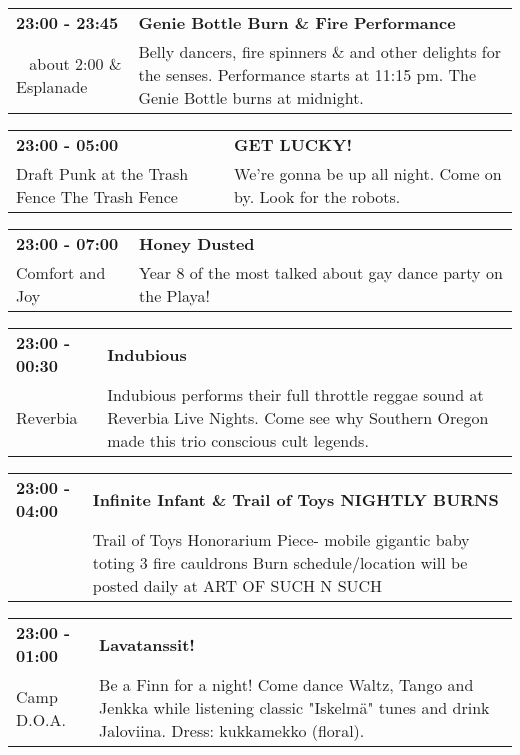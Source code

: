 \begin{tabular}{ p{1in} p{2.2in} }
    \textbf{23:00 - 23:45} & \textbf{Genie Bottle Burn \& Fire Performance} \\
    ~ \newline about 2:00 \& Esplanade & Belly dancers, fire spinners \& and other delights for the senses.  Performance starts at 11:15 pm.  The Genie Bottle burns at midnight. \\
    \hline 
\end{tabular}
    
\begin{tabular}{ p{1in} p{2.2in} }
    \textbf{23:00 - 05:00} & \textbf{GET LUCKY!} \\
    Draft Punk at the Trash Fence \newline The Trash Fence & We're gonna be up all night. Come on by. Look for the robots. \\
    \hline 
\end{tabular}
    
\begin{tabular}{ p{1in} p{2.2in} }
    \textbf{23:00 - 07:00} & \textbf{Honey Dusted} \\
    Comfort and Joy \newline  & Year 8 of the most talked about gay dance party on the Playa! \\
    \hline 
\end{tabular}
    
\begin{tabular}{ p{1in} p{2.2in} }
    \textbf{23:00 - 00:30} & \textbf{Indubious} \\
    Reverbia \newline  & Indubious performs their full throttle reggae sound at Reverbia Live Nights.  Come see why Southern Oregon made this trio conscious cult legends. \\
    \hline 
\end{tabular}
    
\begin{tabular}{ p{1in} p{2.2in} }
    \textbf{23:00 - 04:00} & \textbf{Infinite Infant \& Trail of Toys NIGHTLY BURNS} \\
    ~ \newline  & Trail of Toys Honorarium Piece- mobile gigantic baby toting 3 fire cauldrons Burn schedule/location will be posted daily at ART OF SUCH N SUCH \\
    \hline 
\end{tabular}
    
\begin{tabular}{ p{1in} p{2.2in} }
    \textbf{23:00 - 01:00} & \textbf{Lavatanssit!} \\
    Camp D.O.A. \newline  & Be a Finn for a night! Come dance Waltz, Tango and Jenkka while listening classic "Iskelm\"a" tunes and drink Jaloviina. Dress: kukkamekko (floral). \\
    \hline 
\end{tabular}
    
